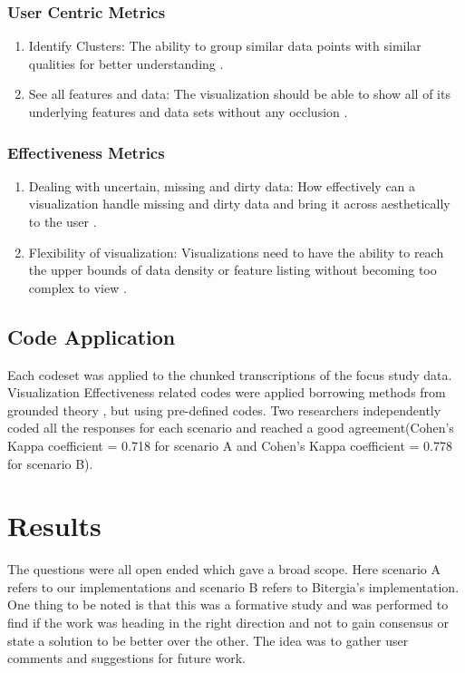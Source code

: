 \documentclass[double,12pt]{beavtex}
\begin{document}
\subsection{User Centric Metrics}

\begin{enumerate}
\item Identify Clusters: The ability to group similar data points with similar qualities for better understanding \cite{grins2001}.

\item See all features and data: The visualization should be able to show all of its underlying features and data sets without any occlusion \cite{grins2001}.
\end{enumerate}

\subsection{Effectiveness Metrics}

\begin{enumerate}
\item Dealing with uncertain, missing and dirty data: How effectively can a visualization handle missing and dirty data and bring it across aesthetically to the user \cite{grins2001}.

\item Flexibility of visualization: Visualizations need to have the ability to reach the upper bounds of data density or feature listing without becoming too complex to view \cite{grins2001}.
\end{enumerate}

\section{Code Application}
Each codeset was applied to the chunked transcriptions of the focus study data. Visualization Effectiveness related  codes  were  applied borrowing methods from  grounded theory \cite{corbin2008}, but using pre-­defined codes. Two researchers independently coded all the responses for each scenario and reached a good agreement(Cohen’s  Kappa  coefficient  =  0.718 for scenario A and Cohen’s  Kappa  coefficient  =  0.778 for scenario B).

\chapter{Results}
The questions were all open ended which gave a broad scope. Here scenario A refers to our implementations and scenario B refers to Bitergia's implementation. One thing to be noted is that this was a formative study and was performed to find if the work was heading in the right direction and not to gain consensus or state a solution to be better over the other. The idea was to gather user comments and suggestions for future work.
\end{document}
